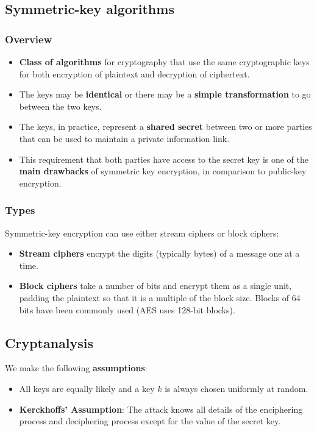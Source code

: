 
\subsection{Symmetric-key algorithms}

\subsubsection{Overview}
\begin{itemize}
\item \textbf{Class of algorithms} for cryptography that use the same
  cryptographic keys for both encryption of plaintext and decryption
  of ciphertext.
\item The keys may be \textbf{identical} or there may be a \textbf{simple
  transformation} to go between the two keys.
\item The keys, in practice, represent a \textbf{shared secret} between two or
  more parties that can be used to maintain a private information
  link.
\item This requirement that both parties have access to the secret key
  is one of the \textbf{main drawbacks} of symmetric key encryption, in
  comparison to public-key encryption.
\end{itemize}

\subsubsection{Types}
Symmetric-key encryption can use either stream ciphers or block ciphers:
\begin{itemize}
\item \textbf{Stream ciphers} encrypt the digits (typically bytes) of a
  message one at a time.
\item \textbf{Block ciphers} take a number of bits and encrypt them as a
  single unit, padding the plaintext so that it is a multiple of the
  block size. Blocks of 64 bits have been commonly used (AES uses
  128-bit blocks).
\end{itemize}

\subsection{Cryptanalysis}

We make the following \textbf{assumptions}:
\begin{itemize}
\item All keys are equally likely and a key $k$ is always chosen
  uniformly at random.
\item \textbf{Kerckhoffs’ Assumption}: The attack knows all details of
  the enciphering process and deciphering process except for the
  value of the secret key.
\end{itemize}

